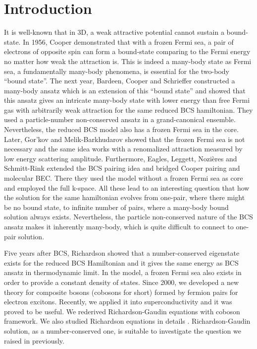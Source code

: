 \documentclass[aps,prb,showpacs,reprint]{revtex4-1}
\begin{document}
\section{Introduction}
It is well-known that in 3D, a weak attractive potential cannot sustain a bound-state.  In 1956, Cooper demonstrated that with a frozen Fermi sea, a pair of electrons of opposite spin can form a bound-state comparing to the Fermi energy no matter how weak the attraction is\cite{Cooper}.  This is indeed a many-body state as Fermi sea, a fundamentally many-body phenomena,  is essential for the two-body ``bound state''.   The next year, Bardeen, Cooper and Schrieffer constructed a many-body ansatz which is an extension of this ``bound state'' and showed that this ansatz gives an intricate many-body state with lower energy than free Fermi gas with arbitrarily weak attraction\cite{BCS} for the same reduced BCS hamiltonian.  They used a particle-number non-conserved ansatz in a grand-canonical ensemble.  Nevertheless, the reduced BCS model also has a frozen Fermi sea in the core. Later,   Gor'kov and Melik-Barkhudarov showed that the frozen Fermi sea is not necessary and the same idea works with a renomalized attraction measured by low energy scattering amplitude\cite{Gorkov}.   Furthermore, Eagles\cite{Eagle}, Leggett\cite{LeggettCrossover}, Nozi\`{e}res and Schmitt-Rink\cite{Nozieres} extended the BCS pairing idea and bridged Cooper pairing and molecular BEC. There they used the model without a frozen Fermi sea as core and employed the full k-space.  All these lead to an interesting question that how the solution for the same hamiltonian evolves from one-pair, where there might be no bound state, to infinite number of pairs, where a many-body bound solution always exists.  Nevertheless, the particle non-conserved nature of the BCS ansatz makes it inherently many-body, which is quite difficult to connect to one-pair solution.  

Five years after BCS, Richardson showed that a number-conserved eigenstate exists for the reduced BCS Hamiltonian and it gives the same energy as BCS ansatz in thermodynamic limit\cite{Richardson1,Richardson2,Richardson3,Richardson1968,gaudin}.  In the model, a frozen Fermi sea also exists in order to provide a constant density of states.  Since 2000, we developed a new theory for composite bosons (cobosons for short) formed by fermion pairs for electron excitons\cite{CobosonPhysicsReports}.   Recently, we applied it into superconductivity and it was proved to be useful.  We rederived Richardson-Gaudin equations with coboson framework\cite{CobosonBcsRich}. We also studied Richardson equations in details \cite{CombescotCooper,combescotBCS}.  Richardson-Gaudin solution, as a number-conserved one, is  suitable to investigate the question we raised in previously.  
\end{document}
